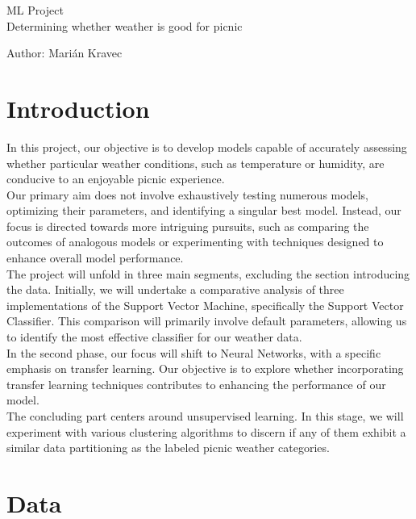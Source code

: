 \documentclass[a4paper]{article}
\begin{document}
 
	
	\pagestyle{plain}
	
	\begin{center}
		\sc\large
		ML Project
		\\
		Determining whether weather is good for picnic 
	\end{center}
	
	Author: Marián Kravec
	
	\section{Introduction}
	
	In this project, our objective is to develop models capable of accurately assessing whether particular weather conditions, such as temperature or humidity, are conducive to an enjoyable picnic experience.
	\\
	
	Our primary aim does not involve exhaustively testing numerous models, optimizing their parameters, and identifying a singular best model. Instead, our focus is directed towards more intriguing pursuits, such as comparing the outcomes of analogous models or experimenting with techniques designed to enhance overall model performance.
	\\
	
	The project will unfold in three main segments, excluding the section introducing the data. Initially, we will undertake a comparative analysis of three implementations of the Support Vector Machine, specifically the Support Vector Classifier. This comparison will primarily involve default parameters, allowing us to identify the most effective classifier for our weather data.
	\\
	
	In the second phase, our focus will shift to Neural Networks, with a specific emphasis on transfer learning. Our objective is to explore whether incorporating transfer learning techniques contributes to enhancing the performance of our model.
	\\
	
	The concluding part centers around unsupervised learning. In this stage, we will experiment with various clustering algorithms to discern if any of them exhibit a similar data partitioning as the labeled picnic weather categories.
	
	\newpage

	\section{Data}
	
\end{document}
